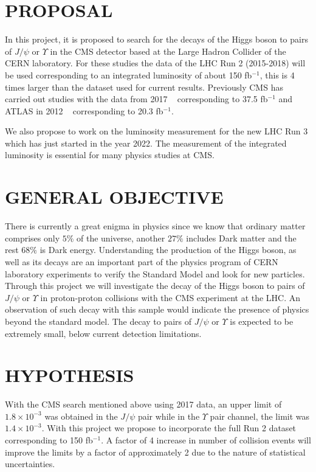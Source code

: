 \documentclass[final,3p]{CSP}
\begin{document}
  
\clearpage
\section{PROPOSAL}
\onehalfspacing In this project, it is proposed to search for the decays of the Higgs boson to pairs of $J/\psi$ or $\Upsilon$ in the CMS detector based at the Large Hadron Collider of the CERN laboratory. For these studies the data of the LHC Run 2 (2015-2018) will be used corresponding to an integrated luminosity of about 150 fb$^{-1}$, this is 4 times larger than the dataset used for current results. Previously CMS has carried out studies with the data from 2017 ~\cite{2019134811} corresponding to 37.5 fb$^{-1}$ and ATLAS in 2012 ~\cite{PhysRevLett.114.121801} corresponding to 20.3 fb$^{-1}$.
    
\onehalfspacing We also propose to work on the luminosity measurement for the new LHC Run 3 which has just started in the year 2022. The measurement of the integrated luminosity is essential for many physics studies at CMS.

\section{GENERAL OBJECTIVE}
\onehalfspacing There is currently a great enigma in physics since we know that ordinary matter comprises only $5\%$ of the universe, another $27\%$ includes Dark matter and the rest $68\%$ is Dark energy.
Understanding the production of the Higgs boson, as well as its decays are an important part of the physics program of CERN laboratory experiments to verify the Standard Model and look for new particles. Through this project we will investigate the decay of the Higgs boson to pairs of $J/\psi$ or $\Upsilon$ in proton-proton collisions with the CMS experiment at the LHC. An observation of such decay  with this sample would indicate the presence of physics beyond the standard model. The decay to pairs of $J/\psi$ or $\Upsilon$ is expected to be extremely small, below  current detection limitations. 

\section{HYPOTHESIS}
\onehalfspacing With the CMS search mentioned above using 2017 data, an upper limit of $1.8 \times 10^{-3}$ was obtained in the $J/\psi$ pair while in the $\Upsilon$ pair channel, the limit was $1.4 \times 10^{-3}$. With this project we propose to incorporate the full Run 2 dataset corresponding to 150 fb$^{-1}$. A factor of 4 increase in number of collision events will improve the limits by a factor of approximately 2 due to the nature of statistical uncertainties. 
\end{document}
